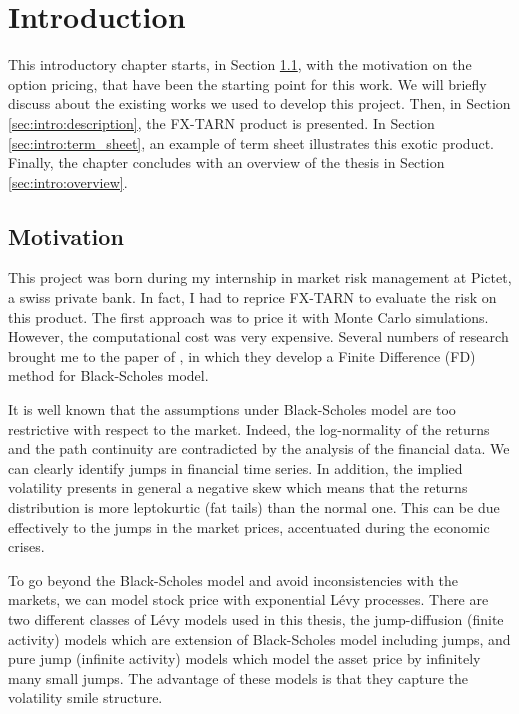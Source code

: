 \chapter{Introduction}
\label{sec:intro}


This introductory chapter starts, in Section \ref{sec:intro:motivation}, with the motivation on the option pricing, that have been the starting point for this work. We will briefly discuss about the existing works we used to develop this project. Then, in Section \ref{sec:intro:description}, the FX-TARN product is presented. In Section \ref{sec:intro:term_sheet}, an example of term sheet illustrates this exotic product. Finally, the chapter concludes with an overview of the thesis in Section \ref{sec:intro:overview}.

\section{Motivation}
\label{sec:intro:motivation}
This project was born during my internship in market risk management at Pictet, a swiss private bank. In fact, I had to reprice FX-TARN to evaluate the risk on this product. The first approach was to price it with Monte Carlo simulations. However, the computational cost was very expensive. Several numbers of research brought me to the paper of \citeauthor{LS15} \citeyearpar{LS15} \cite{LS15}, in which they develop a Finite Difference (FD) method for Black-Scholes model. 

It is well known that the assumptions under Black-Scholes model are too restrictive with respect to the market. Indeed, the log-normality of the returns and the path continuity are contradicted by the analysis of the financial data. We can clearly identify jumps in financial time series. In addition, the implied volatility presents in general a negative skew which means that the returns distribution is more leptokurtic (fat tails) than the normal one. This can be due effectively to the jumps in the market prices, accentuated during the economic crises.

To go beyond the Black-Scholes model and avoid inconsistencies with the markets, we can model stock price with exponential L\'evy processes. There are two different classes of L\'evy models used in this thesis, the jump-diffusion (finite activity) models which are extension of Black-Scholes model including jumps, and pure jump (infinite activity) models which model the asset price by infinitely many small jumps. The advantage of these models is that they capture
the volatility smile structure. 

